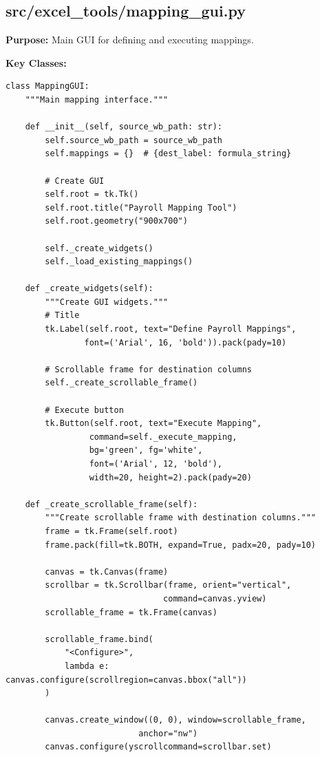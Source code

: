 \subsection{src/excel\_tools/mapping\_gui.py}

\textbf{Purpose:} Main GUI for defining and executing mappings.

\textbf{Key Classes:}

\begin{lstlisting}[style=pythonstyle]
class MappingGUI:
    """Main mapping interface."""
    
    def __init__(self, source_wb_path: str):
        self.source_wb_path = source_wb_path
        self.mappings = {}  # {dest_label: formula_string}
        
        # Create GUI
        self.root = tk.Tk()
        self.root.title("Payroll Mapping Tool")
        self.root.geometry("900x700")
        
        self._create_widgets()
        self._load_existing_mappings()
    
    def _create_widgets(self):
        """Create GUI widgets."""
        # Title
        tk.Label(self.root, text="Define Payroll Mappings",
                font=('Arial', 16, 'bold')).pack(pady=10)
        
        # Scrollable frame for destination columns
        self._create_scrollable_frame()
        
        # Execute button
        tk.Button(self.root, text="Execute Mapping",
                 command=self._execute_mapping,
                 bg='green', fg='white',
                 font=('Arial', 12, 'bold'),
                 width=20, height=2).pack(pady=20)
    
    def _create_scrollable_frame(self):
        """Create scrollable frame with destination columns."""
        frame = tk.Frame(self.root)
        frame.pack(fill=tk.BOTH, expand=True, padx=20, pady=10)
        
        canvas = tk.Canvas(frame)
        scrollbar = tk.Scrollbar(frame, orient="vertical",
                                command=canvas.yview)
        scrollable_frame = tk.Frame(canvas)
        
        scrollable_frame.bind(
            "<Configure>",
            lambda e: canvas.configure(scrollregion=canvas.bbox("all"))
        )
        
        canvas.create_window((0, 0), window=scrollable_frame,
                           anchor="nw")
        canvas.configure(yscrollcommand=scrollbar.set)
        

\end{lstlisting}
